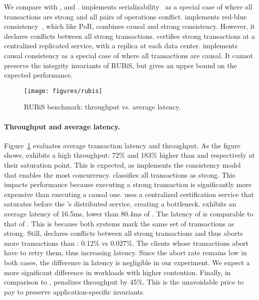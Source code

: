 We compare \System with \Strong, \RedBlue and \Causal.
\Strong implements serializability~\cite{wv} as a special case of \System where
all transactions are strong and all pairs of operations conflict.
\RedBlue implements red-blue consistency~\cite{red-blue}, which like PoR,
combines causal and strong consistency. However, it declares conflicts between
all strong transactions. \RedBlue certifies strong transactions at a centralized
replicated service, with a replica at each data center. \Causal implements causal
consistency as a special case of \System where
all transactions are causal. It cannot
preserve the integrity invariants of RUBiS, but gives an upper bound on the
expected performance.



\begin{figure}[t]
\texttt{[image: figures/rubis]}
\caption{RUBiS benchmark: throughput vs. average latency.}
\label{fig:rubis}
\end{figure}

\paragraph{Throughput and average latency.}
Figure~\ref{fig:rubis} evaluates
average transaction latency and throughput. As the figure shows, \System
exhibits a high throughput: 72\% and 183\% higher than \RedBlue and \Strong
respectively at their saturation point. This is expected, as \System implements 
the consistency model that enables the most concurrency. \Strong
classifies all transactions as strong. This impacts performance 
because executing a strong transaction is significantly more expensive
than executing a causal one. \RedBlue uses a centralized certification service
that saturates before the \System's distributed service, creating
a bottleneck. \System exhibits an average latency of 16.5ms, lower than 
80.4ms of \Strong. The latency of \RedBlue is comparable to that of
\System. This is because both systems mark the same set of
transactions as strong. Still, \RedBlue declares conflicts between all
strong transactions and thus aborts more transactions than
\System: 0.12\% vs 0.027\%. The clients whose transactions abort have to retry
them, thus increasing latency. Since the abort rate remains low in both cases, 
the difference in latency is negligible in our experiment.
We expect a more significant difference in workloads with higher contention.
Finally, in comparison
to \Causal, \System penalizes throughput by 45\%. This is the unavoidable price
to pay to preserve application-specific invariants.



